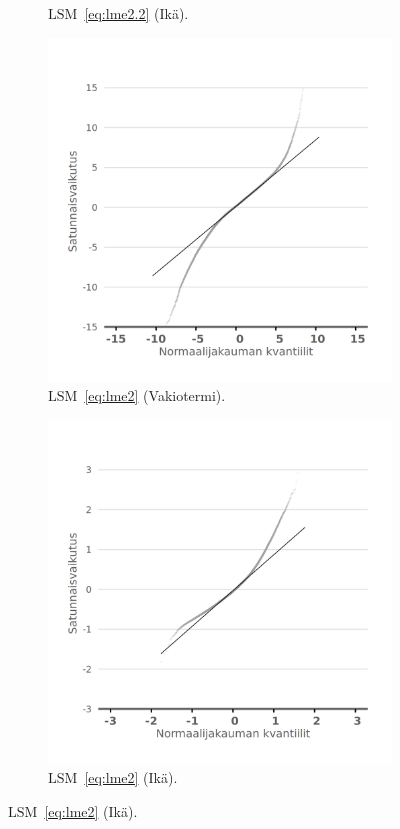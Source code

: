 \documentclass[finnish]{docopts}
\begin{document}
\begin{figure}[H]
\begin{subfigure}[b]{0.4\textwidth}
  \caption{$\text{LSM}$~\ref{eq:lme2.2} (Ikä).}
  \label{fig:lme_krit_ika_qq}
\end{subfigure}
\begin{subfigure}[b]{0.4\textwidth}
\centering
  \includegraphics[width=.8\linewidth]{kuvaajat/lme3_full_qq_ranef_int.png}
  \caption{$\text{LSM}$~\ref{eq:lme2} (Vakiotermi).}
  \label{fig:lme_taysi_int_qq}
\end{subfigure}%
\begin{subfigure}[b]{0.4\textwidth}
\centering
  \includegraphics[width=.8\linewidth]{kuvaajat/lme3_full_qq_ranef_ika.png}
  \caption{$\text{LSM}$~\ref{eq:lme2} (Ikä).}

\end{subfigure}
\end{figure}
\end{document}
